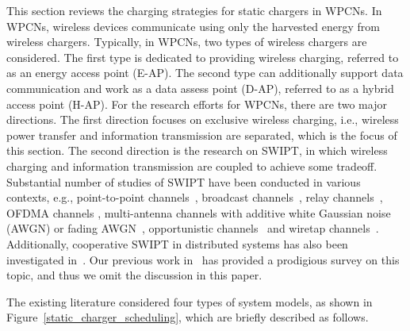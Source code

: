 \documentclass[twocolumn,10pt]{IEEEtran}
\begin{document}
This section reviews the charging strategies for static chargers in WPCNs. In WPCNs, wireless devices communicate using only the harvested energy from wireless chargers. Typically, in WPCNs, two types of wireless chargers are considered. The first type is dedicated to providing wireless charging, referred to as an energy access point (E-AP). The second type can additionally support data communication and work as a data assess point (D-AP), referred to as a hybrid access point (H-AP). For the research efforts for WPCNs, there are two major directions. The first direction focuses on exclusive wireless charging, i.e., wireless power transfer and information transmission are separated, which is the focus of this section. The second direction is the research on SWIPT, in which wireless charging and information transmission are coupled to achieve some tradeoff. Substantial number of studies of SWIPT have been conducted in various contexts, e.g., point-to-point channels~\cite{I.FlintMay2015,X.LuMarch2015,I.FlintDecember2014,C.2015Liu}, broadcast channels~\cite{K.2015Lee,S.2015Timotheou,W.K.2014Ng}, relay channels~\cite{K.2015Xiong,H.2015Chen,Y.2015Huang,A.2013Nasir}, OFDMA channels \cite{K.2013Ng},  multi-antenna channels with additive white Gaussian noise (AWGN) or fading AWGN~\cite{X.2015Chen,R.2015Morsi,R.2015Zhang,W.K.Ng2014}, opportunistic channels~\cite{K.2015Ng,I.2014Krikidis,N.Zhao2015,M2015Tian} and wiretap channels~\cite{H.2015Xing,2015A.Khandaker,Q.2015Shi,Q.Zhang2015}. Additionally, cooperative SWIPT in distributed systems has also been investigated in~\cite{2015S.Lee,W.K.Ng2015}.  Our previous work in~\cite{X.LuSurvey} has provided a prodigious survey on this topic, and thus we omit the discussion in this paper.


The existing literature considered four types of system models, as shown in Figure~\ref{static_charger_scheduling}, which are briefly described as follows.
\end{document}
